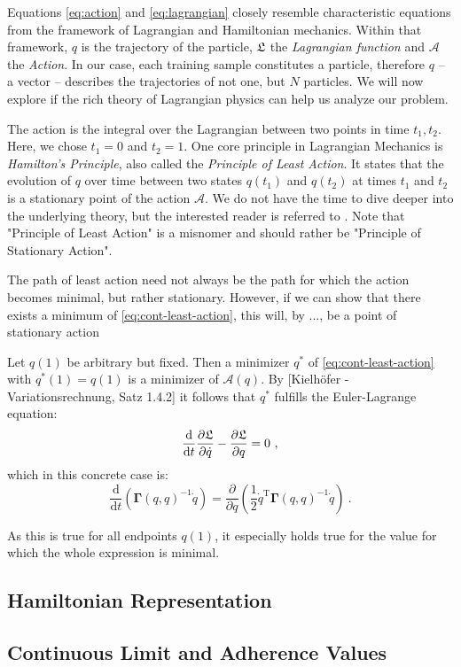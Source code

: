 Equations \ref{eq:action} and \ref{eq:lagrangian} closely resemble characteristic equations from the framework of Lagrangian and Hamiltonian mechanics.
Within that framework, $q$ is the trajectory of the particle, $\mathfrak{L}$ the \emph{Lagrangian function} and $\mathcal{A}$ the \emph{Action}.
In our case, each training sample constitutes a particle, therefore $q$ -- a vector -- describes the trajectories of not one, but $N$ particles.
We will now explore if the rich theory of Lagrangian physics can help us analyze our problem.

The action is the integral over the Lagrangian between two points in time $t_1, t_2$.
Here, we chose $t_1 = 0$ and $t_2 = 1$.
One core principle in Lagrangian Mechanics is \emph{Hamilton's Principle}, also called the \emph{Principle of Least Action}.
It states that
the evolution of $q$ over time between two states $q(t_1)$ and $q(t_2)$ at times $t_1$ and $t_2$ is a stationary point of the action $\mathcal{A}$.
We do not have the time to dive deeper into the underlying theory, but the interested reader is referred to .
Note that "Principle of Least Action" is a misnomer and should rather be "Principle of Stationary Action".


The path of least action need not always be the path for which the action becomes minimal, but rather stationary.
However, if we can show that there exists a minimum of \cref{eq:cont-least-action}, this will, by ..., be a point of stationary action

Let $q(1)$ be arbitrary but fixed.
Then a minimizer $q^\ast$ of \cref{eq:cont-least-action} with $q^\ast(1) = q(1)$ is a minimizer of $\mathcal{A}(q)$.
By [Kielhöfer - Variationsrechnung, Satz 1.4.2] it follows that $q^\ast$ fulfills the Euler-Lagrange equation:
\begin{equation}
	\frac{\mathrm{d}}{\mathrm{d}t} \frac{\partial \fL}{\partial \dot{q}} - \frac{\partial \fL}{\partial q} = 0 \ ,
\end{equation}
which in this concrete case is:
\begin{equation}
	\frac{\mathrm{d}}{\mathrm{d}t} \left(\mathbf{\Gamma}(q, q)^{-1} \dot{q} \right)
	= \frac{\partial}{\partial q} \left(\frac{1}{2} \dot{q}^\mathrm{T} \mathbf{\Gamma}(q, q)^{-1} \dot{q}\right) \ .
\end{equation}

As this is true for all endpoints $q(1)$, it especially holds true for the value for which the whole expression is minimal.



\subsection{Hamiltonian Representation}

\subsection{Continuous Limit and Adherence Values}